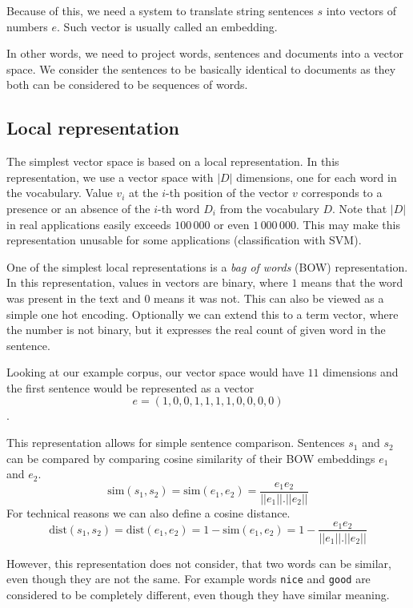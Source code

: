     Because of this, we need a system to translate string sentences $s$ into vectors of numbers $e$.
    Such vector is usually called an embedding. 
    
    In  other words, we need to project words, sentences and documents into a vector space.
    We consider the sentences to be basically identical to documents as they both can be considered to be sequences of words.
    
    \subsection{Local representation} \label{sec:local:representation}
    
    The simplest vector space is based on a local representation.
    In this representation, we use a vector space with $|D|$ dimensions, one for each word in the vocabulary.
    Value $v_i$ at the $i$-th position of the vector $v$ corresponds to a presence or an absence of the $i$-th word $D_i$ from the vocabulary $D$.
    Note that $|D|$ in real applications easily exceeds $100\,000$ or even $1\,000\,000$.
    This may make this representation unusable for some applications (classification with SVM).
    
    One of the simplest local representations is a \textit{bag of words} (BOW) representation. 
    In this representation, values in vectors are binary, where $1$ means that the word was present in the text and $0$ means it was not.
    This can also be viewed as a simple one hot encoding.
    Optionally we can extend this to a term vector, where the number is not binary, but it expresses the real count of given word in the sentence.
    
    Looking at our example corpus,
    our vector space would have $11$ dimensions and the first sentence would be represented as a vector
    $$e = (1, 0, 0, 1, 1, 1, 1, 0, 0, 0, 0)$$.
    
    This representation allows for simple sentence comparison. 
    Sentences $s_1$ and $s_2$ can be compared by comparing cosine similarity of their BOW embeddings $e_1$ and $e_2$.
    $$\mathrm{sim}(s_1, s_2) = \mathrm{sim}(e_1, e_2) = \frac{e_1 e_2}{||e_1||.||e_2||}$$
    For technical reasons we can also define a cosine distance. 
    $$\mathrm{dist}(s_1, s_2) = \mathrm{dist}(e_1, e_2) = 1- \mathrm{sim}(e_1, e_2) = 1 - \frac{e_1 e_2}{||e_1||.||e_2||}$$
    
    However, this representation does not consider, that two words can be similar, even though they are not the same.
    For example words \texttt{nice} and \texttt{good} are considered to be completely different, even though they have similar meaning. 
    
